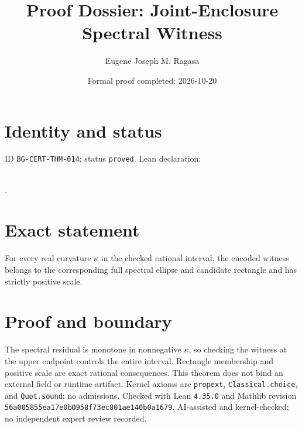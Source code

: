 \documentclass[11pt]{article}
\title{Proof Dossier: Joint-Enclosure Spectral Witness}\author{Eugene Joseph M. Ragasa}\date{Formal proof completed: 2026-10-20}
\begin{document}
\maketitle
\section{Identity and status}
ID \texttt{BG-CERT-THM-014}; status \texttt{proved}. Lean declaration:
\par{}\\
{\tiny{}}.
\section{Exact statement}
For every real curvature $\kappa$ in the checked rational interval, the encoded witness
belongs to the corresponding full spectral ellipse and candidate rectangle and has
strictly positive scale.
\section{Proof and boundary}
The spectral residual is monotone in nonnegative $\kappa$, so checking the witness at the
upper endpoint controls the entire interval. Rectangle membership and positive scale are
exact rational consequences. This theorem does not bind an external field or runtime
artifact. Kernel axioms are \texttt{propext}, \texttt{Classical.choice}, and
\texttt{Quot.sound}; no admissions. Checked with Lean \texttt{4.35.0} and Mathlib
revision \texttt{56a005855ea17e0b0958f73ec801ae140b0a1679}. AI-assisted and
kernel-checked; no independent expert review recorded.
\end{document}
